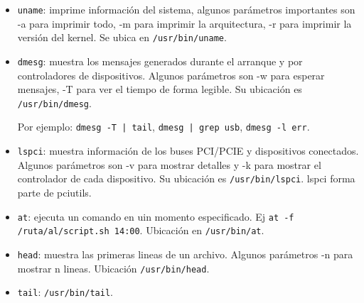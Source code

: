 \documentclass[10pt,a4paper]{paper}
\begin{document}
\begin{itemize}
		\item \texttt{uname}: imprime información del sistema, algunos parámetros
		importantes son -a para imprimir todo, -m para imprimir la arquitectura, -r para
		imprimir la versión del kernel. Se ubica en \texttt{/usr/bin/uname}.
		
		
		\item \texttt{dmesg}: muestra los mensajes generados durante el arranque y por
		controladores de dispositivos. Algunos parámetros son -w para esperar mensajes,
		-T para ver el tiempo de forma legible. Su ubicación  es
		\texttt{/usr/bin/dmesg}.
		
		Por ejemplo: \texttt{dmesg -T | tail}, \texttt{dmesg | grep usb}, \texttt{dmesg
			-l err}.
		
		
		
		\item \texttt{lspci}: muestra información de los buses PCI/PCIE y dispositivos
		conectados. Algunos parámetros son -v para mostrar detalles y -k para mostrar el
		controlador de cada dispositivo. Su ubicación es \texttt{/usr/bin/lspci}. lspci
		forma parte de pciutils.
		
		\item \texttt{at}: ejecuta un comando en uin momento especificado. Ej
		\texttt{at -f /ruta/al/script.sh 14:00}. Ubicación en \texttt{/usr/bin/at}.
		
		
		\item \texttt{head}: muestra las primeras lineas de un archivo. Algunos
		parámetros -n para mostrar n lineas. Ubicación \texttt{/usr/bin/head}.
		
		\item \texttt{tail}: \texttt{/usr/bin/tail}.
	\end{itemize}
	
	
	
\end{document}
